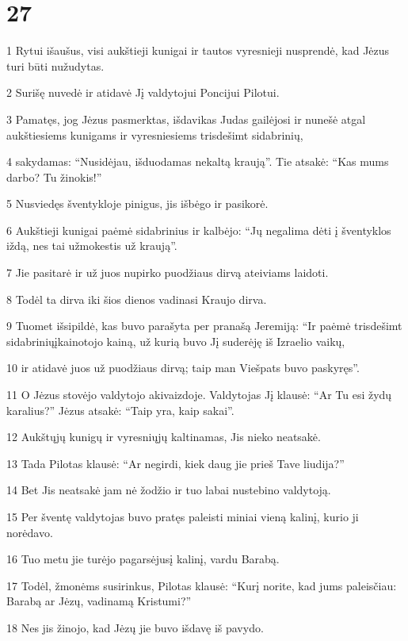 \chapter{27}


\par 1 Rytui išaušus, visi aukštieji kunigai ir tautos vyresnieji nusprendė, kad Jėzus turi būti nužudytas. 
\par 2 Surišę nuvedė ir atidavė Jį valdytojui Poncijui Pilotui. 
\par 3 Pamatęs, jog Jėzus pasmerktas, išdavikas Judas gailėjosi ir nunešė atgal aukštiesiems kunigams ir vyresniesiems trisdešimt sidabrinių, 
\par 4 sakydamas: “Nusidėjau, išduodamas nekaltą kraują”. Tie atsakė: “Kas mums darbo? Tu žinokis!” 
\par 5 Nusviedęs šventykloje pinigus, jis išbėgo ir pasikorė. 
\par 6 Aukštieji kunigai paėmė sidabrinius ir kalbėjo: “Jų negalima dėti į šventyklos iždą, nes tai užmokestis už kraują”. 
\par 7 Jie pasitarė ir už juos nupirko puodžiaus dirvą ateiviams laidoti. 
\par 8 Todėl ta dirva iki šios dienos vadinasi Kraujo dirva. 
\par 9 Tuomet išsipildė, kas buvo parašyta per pranašą Jeremiją: “Ir paėmė trisdešimt sidabrinių­įkainotojo kainą, už kurią buvo Jį suderėję iš Izraelio vaikų,­ 
\par 10 ir atidavė juos už puodžiaus dirvą; taip man Viešpats buvo paskyręs”. 
\par 11 O Jėzus stovėjo valdytojo akivaizdoje. Valdytojas Jį klausė: “Ar Tu esi žydų karalius?” Jėzus atsakė: “Taip yra, kaip sakai”. 
\par 12 Aukštųjų kunigų ir vyresniųjų kaltinamas, Jis nieko neatsakė. 
\par 13 Tada Pilotas klausė: “Ar negirdi, kiek daug jie prieš Tave liudija?” 
\par 14 Bet Jis neatsakė jam nė žodžio ir tuo labai nustebino valdytoją. 
\par 15 Per šventę valdytojas buvo pratęs paleisti miniai vieną kalinį, kurio ji norėdavo. 
\par 16 Tuo metu jie turėjo pagarsėjusį kalinį, vardu Barabą. 
\par 17 Todėl, žmonėms susirinkus, Pilotas klausė: “Kurį norite, kad jums paleisčiau: Barabą ar Jėzų, vadinamą Kristumi?” 
\par 18 Nes jis žinojo, kad Jėzų jie buvo išdavę iš pavydo. 
